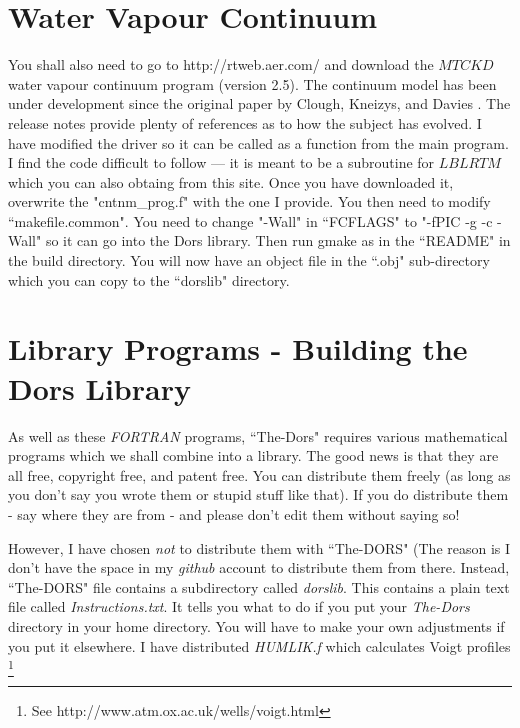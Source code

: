 \documentclass[12pt]{article}
\begin{document}
\section{Water Vapour Continuum}

You shall also need to go to http://rtweb.aer.com/ and download the $MT CKD$ water vapour continuum program (version 2.5). The continuum model has been under development since the original paper by Clough, Kneizys, and Davies \cite{MTCKD:Mybib}. The release notes provide plenty of references as to how the subject has evolved. I have modified the driver so it can be called
as a function from the main program. I find the code difficult to follow --- it is meant to be a subroutine for $LBLRTM$
which you can also obtaing from this site. Once you have downloaded it, overwrite the "cntnm_prog.f"  with the one I provide.
You then need to modify ``makefile.common". You need to change "-Wall" in ``FCFLAGS"  to "-fPIC -g -c -Wall" so it can go into the Dors library. Then run gmake as in the ``README" in the build directory. You will now have an object file in the ``.obj"
 sub-directory which you can copy to the ``dorslib" directory.





\section{Library Programs - Building the Dors Library}

As well as these {\it FORTRAN} programs, ``The-Dors" requires various mathematical programs which we shall
 combine into a library. The good news is
that they are all free, copyright free, and patent free. You can distribute them freely (as long as you don't say you wrote
 them or stupid stuff like that). If you do distribute them - say where they are from - and please don't edit them without saying so!  

However, I have chosen {\it not} to distribute
them with ``The-DORS" (The reason is I don't have the space in my {\it github} account to distribute
them from there.  Instead, ``The-DORS" file contains a subdirectory called  {\it dorslib}.
This contains a plain text file called {\it Instructions.txt}. It tells you what to do if you put your {\it The-Dors}
directory in your home directory. You will have to make your own adjustments if you put it elsewhere.
I have distributed {\it HUMLIK.f} \cite{BobWells:MyBib} which calculates Voigt profiles
 \footnote{See http://www.atm.ox.ac.uk/wells/voigt.html}
\end{document}
